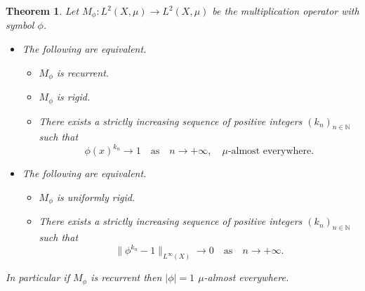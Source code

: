 \documentclass[12pt,leqno]{amsart}
\theoremstyle{plain}
\newtheorem{theorem}[equation]{Theorem}
\theoremstyle{definition}
\numberwithin{equation}{section}
\begin{document}
\begin{theorem}
	\label{t.multcond} Let $M_\phi:L^2(X,\mu)\to L^2(X,\mu)$ be the multiplication operator with symbol $\phi$. 
	\begin{itemize}
		\item[(A)] The following are equivalent. 
		\begin{itemize}
			\item [(i)] $M_\phi$ is recurrent. 
			\item [(ii)] $M_\phi$ is rigid. 
			\item [(iii)] There exists a strictly increasing sequence of positive integers $(k_n)_{n\in\mathbb N}$ such that 
			\begin{equation}
				\label{e.cond} \phi(x)^{k_n}\to 1\quad\text{as}\quad n\to +\infty,\quad \mu \text{-almost everywhere}. 
			\end{equation}
		\end{itemize}
		\item[(B)] The following are equivalent. 
		\begin{itemize}
			\item [(i)] $M_\phi$ is uniformly rigid. 
			\item [(ii)] There exists a strictly increasing sequence of positive integers $(k_n)_{n\in\mathbb N}$ such that 
			\begin{equation*}
				\|\phi^{k_n}-1\|_{L^\infty(X)} \to 0\quad\text{as}\quad n\to +\infty. 
			\end{equation*}
		\end{itemize}
	\end{itemize}
	In particular if $M_\phi$ is recurrent then $|\phi|=1$ $\mu$-almost everywhere. 
\end{theorem}
\end{document}
